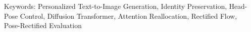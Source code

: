 

\vspace{1em}
\noindent Keywords: Personalized Text-to-Image Generation, Identity Preservation, Head-Pose Control, Diffusion Transformer, Attention Reallocation, Rectified Flow, Pose-Rectified Evaluation
